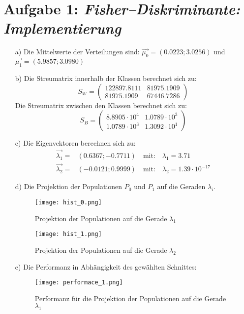 \section*{Aufgabe 1: \emph{Fisher--Diskriminante: Implementierung}}
\begin{itemize}
\item[a)] Die Mittelwerte der Verteilungen sind: $\vec{\mu_0} = (0.0223 ; 3.0256) $ und $\vec{\mu_1} = (5.9857 ; 3.0980)$

\item[b)] Die Streumatrix innerhalb der Klassen berechnet sich zu:
\begin{equation}
S_W = 	\begin{pmatrix} 122897.8111 & 81975.1909\\
 						81975.1909 & 67446.7286
 		\end{pmatrix} 
\end{equation}
Die Streumatrix zwischen den Klassen berechnet sich zu:
\begin{equation}
S_B = 	\begin{pmatrix}	8.8905\cdot 10^{4}  & 1.0789\cdot 10^3 \\
						1.0789\cdot 10^{3}  & 1.3092\cdot 10^1
 		\end{pmatrix} 
\end{equation}
\item[c)] Die Eigenvektoren berechnen sich zu:
\begin{align*}
\vec{\lambda_1} =& ( 0.6367 ; -0.7711 ) \quad \text{mit:}\quad \lambda_1 = 3.71 \\
\vec{\lambda_2} =& ( -0.0121 ; 0.9999 ) \quad \text{mit:}\quad \lambda_2 = 1.39 \cdot 10^{-17}
\end{align*}
\item[d)] Die Projektion der Populationen $P_0$ und $P_1$ auf die Geraden $\lambda_i$.
\begin{figure}[H]
	\centering
	\texttt{[image: hist\_0.png]}
	\caption{ Projektion der Populationen auf die Gerade $\lambda_1$}
\end{figure}
\begin{figure}[H]
	\centering
	\texttt{[image: hist\_1.png]}
	\caption{Projektion der Populationen auf die Gerade $\lambda_2$}
\end{figure}
\item[e)] Die Performanz in Abhängigkeit des gewählten Schnittes:
\begin{figure}[H]
	\centering
	\texttt{[image: performace\_1.png]}
	\caption{Performanz für die Projektion der Populationen auf die Gerade $\lambda_1$}

\end{figure}
\end{itemize}
